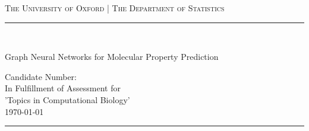 \begin{titlingpage}
\begin{center}
		
		
		
		
		
		\textsc{\centering The University of Oxford | The Department of Statistics}\\[0.2cm]
		
		\newcommand{\HRule}{\rule{\linewidth}{0.5mm}}
		
		
		\begin{flushright}
			\HRule \\[.05cm]
		{  \huge \sc Graph Neural Networks for Molecular Property Prediction\par }
		\vspace*{.6cm}
		{\Large \sc Candidate Number:}\\[0.6cm]
		{\large In Fulfillment of Assessment for \\ 'Topics in Computational Biology'}\\[0.2cm]
		{\today}\\[.05cm]
		\HRule \\[0.4cm]
		\end{flushright}
		
	\end{center}
\begin{abstract}
	\noindent
Der Abstract fasst die zentralen Inhalte der Arbeit zusammen. Eine Wertung oder Interpretation erfolgt nicht. Dies hilft, sich einen groben Überblick über Fragestellung, Vorgehen und Ergebnisse zu verschaffen. Bestandteil sollen die Teile a) Hintergrundinformationen, Fragestellung, Zielsetzung, Forschungskontext, b) Methoden, c) Ergebnisse und d) Schlussfolgerungen, Anwendungsmöglichkeiten sein. Der Text ist knapp, vollständig und präzise, zudem objektiv und ohne persönliche Wertung. Achten Sie auf eine einfache und verständliche Sprache. Alle genannten Inhalte müssen auch im Hauptteil aufgegriffen werden. Den Inhalt objektiv und ohne persönliche Wertung wiedergeben. Gehen Sie auf die wichtigsten Konzepte, Resultate oder Folgerungen ein. Verwenden Sie keine Zitate und verzichten Sie auf Abkürzungen. In der Regel sind ca. 200 Wörter ausreichend.
\end{abstract}
\tableofcontents
\end{titlingpage}



\setcounter{tocdepth}{2}

